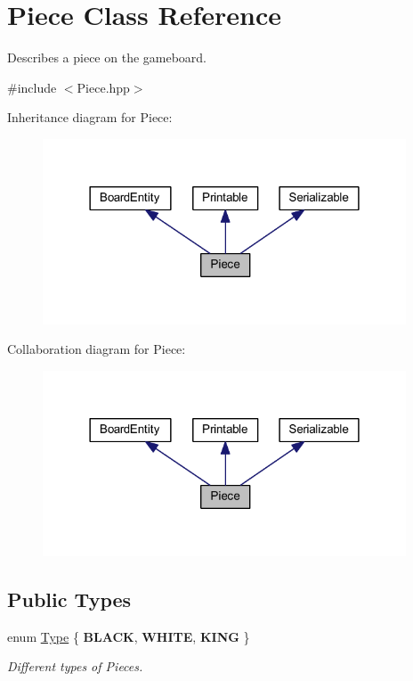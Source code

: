 \hypertarget{class_piece}{\section{Piece Class Reference}
\label{class_piece}
}


Describes a piece on the gameboard.  




{\ttfamily \#include $<$Piece.\-hpp$>$}



Inheritance diagram for Piece\-:
\nopagebreak
\begin{figure}[H]
\begin{center}
\leavevmode
\includegraphics[width=306pt]{class_piece__inherit__graph}
\end{center}
\end{figure}


Collaboration diagram for Piece\-:
\nopagebreak
\begin{figure}[H]
\begin{center}
\leavevmode
\includegraphics[width=306pt]{class_piece__coll__graph}
\end{center}
\end{figure}
\subsection*{Public Types}
\begin{DoxyCompactItemize}
\item 
enum \hyperlink{class_piece_abcd044975b3657962abfd2ded9194b09}{Type} \{ {\bfseries B\-L\-A\-C\-K}, 
{\bfseries W\-H\-I\-T\-E}, 
{\bfseries K\-I\-N\-G}
 \}
\begin{DoxyCompactList}\small\item\em Different types of Pieces. \end{DoxyCompactList}\end{DoxyCompactItemize}
